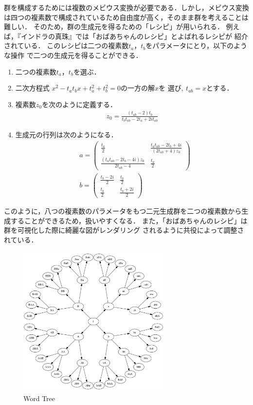 群を構成するためには複数のメビウス変換が必要である．しかし，メビウス変換
は四つの複素数で構成されているため自由度が高く，そのまま群を考えることは
難しい．
そのため，群の生成元を得るための「レシピ」が用いられる．
例えば，『インドラの真珠』では「おばあちゃんのレシピ」とよばれるレシピが
紹介されている．
このレシピは二つの複素数$t_a$，$t_b$をパラメータにとり，以下のような操作
で二つの生成元を得ることができる．
\begin{enumerate}
 \item 二つの複素数$t_a$，$t_b$を選ぶ．
 \item  二次方程式
        $x^2 - t_a t_b x + t_a^2 + t_b^2 = 0 \text{の一方の解}x\text{を
        選び},~t_{ab}= x \text{とする． }$
 \item 複素数$z_0$を次のように定義する．
       \begin{align*}
        z_0 = \frac{(t_{ab} -2)t_b}{t_b t_{ab} - 2 t_a + 2it_{ab}}
       \end{align*}
 \item 生成元の行列は次のようになる．
        \begin{align*}
       &a = \left(
      \begin{array}{ccc}
       \frac{t_a}{2} & \frac{t_a t_{ab} - 2 t_b + 4i}{(2 t_{ab} + 4)z_0} \\
       \frac{(t_a t_{ab} - 2 t_b -4i)z_0}{2 t_{ab} - 4} & \frac{t_a}{2}
      \end{array}
     \right)\\
 &b = \left(
      \begin{array}{ccc}
       \frac{t_b - 2i}{2} & \frac{t_b}{2} \\
       \frac{t_b}{2} & \frac{t_b + 2i}{2}
      \end{array}
     \right)
        \end{align*}
\end{enumerate}
このように，八つの複素数のパラメータをもつ二元生成群を二つの複素数から生
成することができるため，扱いやすくなる．
また，「おばあちゃんのレシピ」は群を可視化した際に綺麗な図がレンダリング
されるように共役によって調整されている．

\begin{figure}[htbp]
 \center
 \includegraphics[width=3in, height=3in, keepaspectratio]{../img/klein/wordTree.pdf}
 \caption{Word Tree}
 \label{fig:wordTree}
\end{figure}

